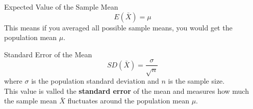 \documentclass[a4paper, 10pt]{article}
\begin{document}
\begin{definitionbox}{Expected Value of the Sample Mean}{}
    $$E(\bar{X}) = \mu$$
    This means if you averaged all possible sample means, you would get the population mean $\mu$.
\end{definitionbox}
\begin{definitionbox}{Standard Error of the Mean}{}
    $$SD(\bar{X}) = \frac{\sigma}{\sqrt{n}}$$
    where $\sigma$ is the population standard deviation and $n$ is the sample size.\\
    
    This value is valled the \textbf{standard error} of the mean and measures how much the sample mean $\bar{X}$ fluctuates around the population mean $\mu$.
\end{definitionbox}
\end{document}
